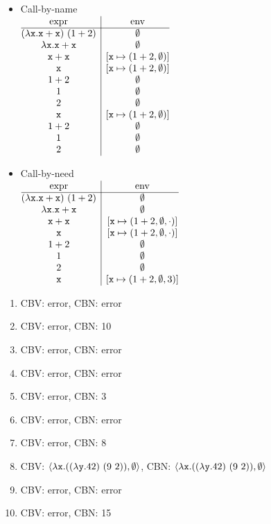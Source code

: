 \textbf{}
\begin{itemize}
  \item Call-by-name\\
$
\begin{array}{@{}c|c@{}}
  \text{expr} & \text{env} \\\hline
  \eapp{(\efun{\cx}{\eadd{\cx}{\cx}})}{(\eadd{1}{2})} & \emptyset \\
  \efun{\cx}{\eadd{\cx}{\cx}} & \emptyset \\
  \eadd{\cx}{\cx} & [\cx\mapsto\exprv{\eadd{1}{2}}{\emptyset}] \\
  \cx & [\cx\mapsto\exprv{\eadd{1}{2}}{\emptyset}] \\
  \eadd{1}{2} & \emptyset \\
  1 & \emptyset \\
  2 & \emptyset \\
  \cx & [\cx\mapsto\exprv{\eadd{1}{2}}{\emptyset}] \\
  \eadd{1}{2} & \emptyset \\
  1 & \emptyset \\
  2 & \emptyset \\
\end{array}
$
  \item Call-by-need\\
$
\begin{array}{@{}c|c@{}}
  \text{expr} & \text{env} \\\hline
  \eapp{(\efun{\cx}{\eadd{\cx}{\cx}})}{(\eadd{1}{2})} & \emptyset \\
  \efun{\cx}{\eadd{\cx}{\cx}} & \emptyset \\
  \eadd{\cx}{\cx} & [\cx\mapsto(\eadd{1}{2},\emptyset,\cdot)] \\
  \cx & [\cx\mapsto(\eadd{1}{2},\emptyset,\cdot)] \\
  \eadd{1}{2} & \emptyset \\
  1 & \emptyset \\
  2 & \emptyset \\
  \cx & [\cx\mapsto(\eadd{1}{2},\emptyset,3)] \\
\end{array}
$
\end{itemize}

\textbf{}
\begin{enumerate}
  \item CBV: error, CBN: error
  \item CBV: error, CBN: 10
  \item CBV: error, CBN: error
  \item CBV: error, CBN: error
  \item CBV: error, CBN: 3
  \item CBV: error, CBN: error
  \item CBV: error, CBN: 8
  \item CBV: $\langle\lambda\texttt{x}.((\lambda\texttt{y}.42)\ (9\ 2)),\emptyset\rangle$,
    CBN: $\langle\lambda\texttt{x}.((\lambda\texttt{y}.42)\ (9\ 2)),\emptyset\rangle$
  \item CBV: error, CBN: error
  \item CBV: error, CBN: 15
\end{enumerate}

